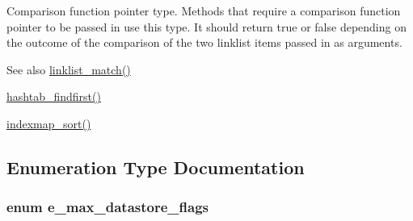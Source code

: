 Comparison function pointer type. Methods that require a comparison function pointer to be passed in use this type. It should return {\ttfamily true} or {\ttfamily false} depending on the outcome of the comparison of the two linklist items passed in as arguments.

\begin{DoxySeeAlso}{See also}
\hyperlink{group__linklist_ga2a991fb645404fe7d9d3327e5a386b80}{linklist\_\-match()} 

\hyperlink{group__hashtab_gadc142f0a2a64417bb8b8d3c2959924fd}{hashtab\_\-findfirst()} 

\hyperlink{group__indexmap_ga37c44ae6f93722ca5a722839ac62966d}{indexmap\_\-sort()} 
\end{DoxySeeAlso}


\subsection{Enumeration Type Documentation}
\hypertarget{group__datastore_gaa858d4b3815076d79624c39d9ca59348}{
\subsubsection[{e\_\-max\_\-datastore\_\-flags}]{\setlength{\rightskip}{0pt plus 5cm}enum {\bf e\_\-max\_\-datastore\_\-flags}}}
\label{group__datastore_gaa858d4b3815076d79624c39d9ca59348}


